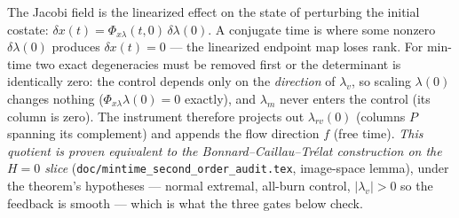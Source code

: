 \documentclass[11pt]{article}
\newcommand{\lv}{\lambda_v}\newcommand{\lr}{\lambda_r}\newcommand{\lm}{\lambda_m}
\newcommand{\file}[1]{\texttt{#1}}
\begin{document}
\begin{intu}
The Jacobi field is the linearized effect on the state of perturbing the
initial costate: $\delta x(t)=\Phi_{x\lambda}(t,0)\,\delta\lambda(0)$. A
conjugate time is where some nonzero $\delta\lambda(0)$ produces
$\delta x(t)=0$ --- the linearized endpoint map loses rank. For min-time two
exact degeneracies must be removed first or the determinant is identically
zero: the control depends only on the \emph{direction} of $\lv$, so scaling
$\lambda(0)$ changes nothing ($\Phi_{x\lambda}\lambda(0)=0$ exactly), and $\lm$
never enters the control (its column is zero). The instrument therefore
projects out $\lambda_{rv}(0)$ (columns $P$ spanning its complement) and appends
the flow direction $f$ (free time). \emph{This quotient is proven equivalent
to the Bonnard--Caillau--Tr\'elat construction on the $H=0$ slice}
(\file{doc/mintime\_second\_order\_audit.tex}, image-space lemma), under the theorem's hypotheses --- normal extremal, all-burn control, $|\lv|>0$ so the feedback is smooth --- which is what the three gates below check.
\end{intu}
\end{document}
